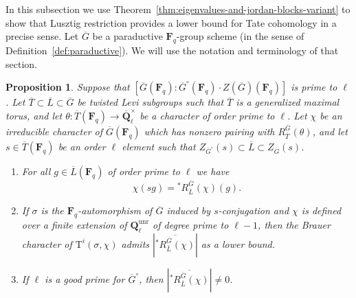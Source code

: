 \documentclass[reqno]{amsart}
\numberwithin{equation}{subsection}
\newcommand{\F}{\mathbf{F}}
\newcommand{\Q}{\mathbf{Q}}
\newcommand{\ol}[1]{\overline{#1}}
\newcommand{\co}{\colon}
\DeclareMathOperator{\unr}{unr}
\newcommand{\rT}{\ensuremath{\mathrm{T}}\xspace}
\newtheorem{prop}[thm]{Proposition}
\theoremstyle{remark}
\numberwithin{equation}{subsection}
\numberwithin{figure}{subsection}
\begin{document}
In this subsection we use Theorem~\ref{thm:eigenvalues-and-jordan-blocks-variant} to show that Lusztig restriction provides a lower bound for Tate cohomology in a precise sense. Let $\ol G$ be a paraductive $\F_q$-group scheme (in the sense of Definition~\ref{def:paraductive}). We will use the notation and terminology of that section.

\begin{prop}\label{prop:tate-cohom-dl-restriction}
    Suppose that $[\ol G(\F_q): \ol G^\circ(\F_q) \cdot Z(\ol G)(\F_q)]$ is prime to $\ell$. Let $\ol T \subset \ol L \subset \ol G$ be twisted Levi subgroups such that $\ol T$ is a generalized maximal torus, and let $\theta\co \ol T(\F_q) \to \ol\Q_\ell^\times$ be a character of order prime to $\ell$. Let $\chi$ be an irreducible character of $\ol G(\F_q)$ which has nonzero pairing with $R_{\ol T}^{\ol G}(\theta)$, and let $s \in \ol T(\F_q)$ be an order $\ell$ element such that $Z_{\ol G^\circ}(s) \subset \ol L \subset Z_{\ol G}(s)$. 
    \begin{enumerate}
        \item For all $g \in \ol L(\F_q)$ of order prime to $\ell$ we have
        \[
        \chi(sg) = {}^*R^{\ol G}_{\ol L}(\chi)(g).
        \]
        \item If $\sigma$ is the $\F_q$-automorphism of $\ol G$ induced by $s$-conjugation and $\chi$ is defined over a finite extension of $\Q_\ell^{\unr}$ of degree prime to $\ell-1$, then the Brauer character of $\rT^i(\sigma, \chi)$ admits $\left|\ol{{}^*R^{\ol G}_{\ol L}(\chi)}\right|$ as a lower bound.
        \item If $\ell$ is a good prime for $\ol G^\circ$, then $\left|\ol{{}^*R^{\ol G}_{\ol L}(\chi)}\right| \neq 0$.
    \end{enumerate}
\end{prop}
\end{document}
